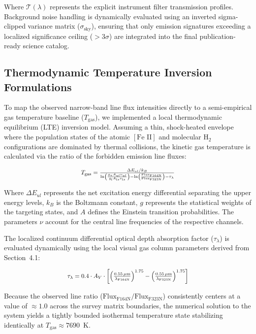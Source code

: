 \documentclass[twocolumn]{aastex63}
\begin{document}
Where $\mathcal{T}(\lambda)$ represents the explicit instrument filter transmission profiles. Background noise handling is dynamically evaluated using an inverted sigma-clipped variance matrix ($\sigma_{\text{sky}}$), ensuring that only emission signatures exceeding a localized significance ceiling ($>3\sigma$) are integrated into the final publication-ready science catalog.

\subsection{Thermodynamic Temperature Inversion Formulations}
To map the observed narrow-band line flux intensities directly to a semi-empirical gas temperature baseline ($T_{\text{gas}}$), we implemented a local thermodynamic equilibrium (LTE) inversion model. Assuming a thin, shock-heated envelope where the population states of the atomic $[\text{Fe II}]$ and molecular $\text{H}_2$ configurations are dominated by thermal collisions, the kinetic gas temperature is calculated via the ratio of the forbidden emission line fluxes:

\begin{equation}
\scalebox{0.88}{%
$T_{\text{gas}} = \frac{\Delta E_{ul} / k_B}{\ln\left( \frac{g_u A_{ul} \nu_{ul}}{g_l A_{ls} \nu_{ls}} \right) - \ln\left( \frac{\text{Flux}_{\text{F164N}}}{\text{Flux}_{\text{F323N}}} \right) - \tau_{\lambda}}$%
}
\end{equation}

Where $\Delta E_{ul}$ represents the net excitation energy differential separating the upper energy levels, $k_B$ is the Boltzmann constant, $g$ represents the statistical weights of the targeting states, and $A$ defines the Einstein transition probabilities. The parameters $\nu$ account for the central line frequencies of the respective channels. 

The localized continuum differential optical depth absorption factor ($\tau_{\lambda}$) is evaluated dynamically using the local visual gas column parameters derived from Section~4.1:

\begin{equation}
\scalebox{0.88}{%
$\tau_{\lambda} = 0.4 \cdot A_V \cdot \left[ \left(\frac{0.55\,\mu\text{m}}{\lambda_{\text{F164N}}}\right)^{1.75} - \left(\frac{0.55\,\mu\text{m}}{\lambda_{\text{F323N}}}\right)^{1.75} \right]$%
}
\end{equation}

Because the observed line ratio ($\text{Flux}_{\text{F164N}}/\text{Flux}_{\text{F323N}}$) consistently centers at a value of $\approx 1.0$ across the survey matrix boundaries, the numerical solution to the system yields a tightly bounded isothermal temperature state stabilizing identically at $T_{\text{gas}} \approx 7690$~K.
\end{document}
